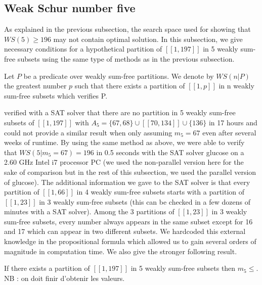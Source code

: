 \subsection{Weak Schur number five}
As explained in the previous subsection, the search space used for showing that \(WS(5) \geqslant 196\) may not contain
optimal solution. In this subsection,
we give necessary conditions for a hypothetical partition of \([\![1,197]\!]\) in 5 weakly sum-free subsets using the
same type of methods as in the
previous subsection.

\begin{notation}
Let \(P\) be a predicate over weakly sum-free partitions. We denote by \(WS(n | P)\) the greatest number \(p\) such that
there exists a partition of
\([\![1,p]\!]\) in n weakly sum-free subsets which verifies P.
\end{notation}

\par
\cite{ELIAHOU2012175} verified with a SAT solver that there are no partition in 5 weakly sum-free subsets of
\([\![1,197]\!]\) with
\(A_5 = \{67, 68\} \cup [\![70,134]\!] \cup \{136\}\) in 17 hours and could not provide a similar result when only
assuming \(m_5 = 67\) even after several
weeks of runtime. By using the same method as above, we were able to verify that \(WS(5 | m_5 = 67) = 196\) in 0.5
seconds with the SAT solver glucose \cite{Glucose}
on a 2.60 GHz Intel i7 processor PC (we used the non-parallel version here for the sake of comparison but in the rest of
this subsection, we used the parallel version of glucose).
The additional information we gave to the SAT solver is that every partition of \([\![1,66]\!]\) in 4 weakly sum-free
subsets starts with a partition of
\([\![1,23]\!]\) in 3 weakly sum-free subsets (this can be checked in a few dozens of minutes with a SAT solver). Among
the 3 partitions of \([\![1,23]\!]\) in
3 weakly sum-free subsets, every number always appears in the same subset except for 16 and 17 which can appear in two
different subsets. We hardcoded
this external knowledge in the propositional formula which allowed us to gain several orders of magnitude in computation
time. We also give the stronger
following result.

\begin{computational theorem}
If there exists a partition of \([\![1,197]\!]\) in 5 weakly sum-free subsets then \(m_5 \leq\). \\
NB : on doit finir d'obtenir les valeurs.
\end{computational theorem}

